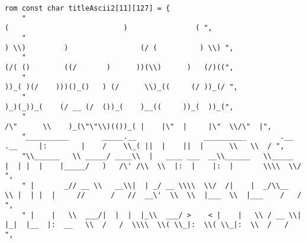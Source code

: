 \begin{lstlisting}
rom const char titleAscii2[11][127] = {
	"                                                                               (                           )                ( ",
	"                                                                            ) \\)         )                 (/ (          ) \\) ",
	"                                                                           (/( ()        ((/       )      ))(\\)      )   (/)((",
	"                                                                          ))_( )(/    )))()_()   ) (/      \\)_((     (/ ))_(/ ",
	"                                                                          )_)(_))_(    (/ __ (/  ())_(    )__((     ))_(  ))_(",
	"                                                                          /\"      \\    )_(\"\"\\)(())_( |    |\"  |     |\"  \\/\"  |",
	"__________        _____.__                __________        .__  .__     |:        |    /    \\_( ||  |    ||  |      \\   \\  / ",
	"\\______   \\ _____/ ____\\  |   ____ ___  __\\______   \\_____  |  | |  |    |_____/   )   /\' /\\  \\  |:  |    |:  |       \\\\  \\/  ",
	" |       _// __ \\   __\\|  | _/ __ \\\\  \\/  /|    |  _/\\__  \\ |  | |  |     //      /   //  __\'  \\  \\  |___  \\  |___    /   /   ",
	" |    |   \\  ___/|  |  |  |_\\  ___/ >    < |    |   \\ / __ \\|  |_|  |__  |:  __   \\  /   /  \\\\  \\( \\_|:  \\( \\_|:  \\  /   /    ",

\end{lstlisting}
